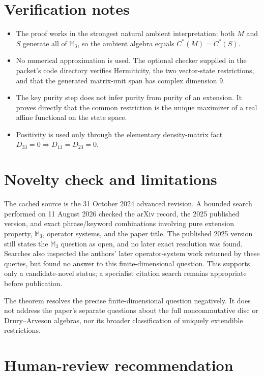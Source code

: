 \documentclass[11pt]{article}
\newcommand{\Mthree}{\mathbb M_3}
\newcommand{\Cstar}{C^*}
\begin{document}
\section*{Verification notes}

\begin{itemize}
\item The proof works in the strongest natural ambient interpretation:
      both \(M\) and \(S\) generate all of \(\Mthree\), so the ambient
      algebra equals \(\Cstar(M)=\Cstar(S)\).
\item No numerical approximation is used.  The optional checker supplied in
      the packet's code directory verifies Hermiticity, the two vector-state
      restrictions, and that the generated matrix-unit span has complex
      dimension \(9\).
\item The key purity step does not infer purity from purity of an extension.
      It proves directly that the common restriction is the unique maximizer
      of a real affine functional on the state space.
\item Positivity is used only through the elementary density-matrix fact
      \(D_{33}=0\Rightarrow D_{13}=D_{23}=0\).
\end{itemize}

\section*{Novelty check and limitations}

The cached source is the 31 October 2024 advanced revision.  A bounded search
performed on 11 August 2026 checked the arXiv record, the 2025 published
version, and exact phrase/keyword combinations involving pure extension
property, \(\mathbb M_3\), operator systems, and the paper title.
The published 2025 version still states the \(\mathbb M_3\) question as open,
and no later exact resolution was found.  Searches also inspected the
authors' later operator-system work returned by these queries, but found no
answer to this finite-dimensional question.  This supports only a
candidate-novel status; a specialist citation search remains appropriate
before publication.

The theorem resolves the precise finite-dimensional question negatively.  It
does not address the paper's separate questions about the full
noncommutative disc or Drury--Arveson algebras, nor its broader classification
of uniquely extendible restrictions.

\section*{Human-review recommendation}
\end{document}

